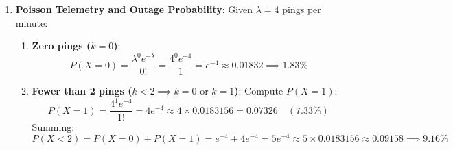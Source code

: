 \begin{enumerate}
    \item \textbf{Poisson Telemetry and Outage Probability}:
    Given $\lambda = 4$ pings per minute:
    \begin{enumerate}[label=(\alph*)]
        \item \textbf{Zero pings ($k = 0$)}:
        \begin{equation*}
        P(X = 0) = \frac{\lambda^0 e^{-\lambda}}{0!} = \frac{4^0 e^{-4}}{1} = e^{-4} \approx \mathbf{0.01832} \implies \mathbf{1.83\%}
        \end{equation*}
        \item \textbf{Fewer than 2 pings ($k < 2 \implies k = 0 \text{ or } k = 1$)}:
        Compute $P(X = 1)$:
        \begin{equation*}
        P(X = 1) = \frac{4^1 e^{-4}}{1!} = 4 e^{-4} \approx 4 \times 0.0183156 = 0.07326 \quad (7.33\%)
        \end{equation*}
        Summing:
        \begin{equation*}
        P(X < 2) = P(X = 0) + P(X = 1) = e^{-4} + 4e^{-4} = 5e^{-4} \approx 5 \times 0.0183156 \approx \mathbf{0.09158} \implies \mathbf{9.16\%}
        \end{equation*}
    \end{enumerate}


\end{enumerate}
